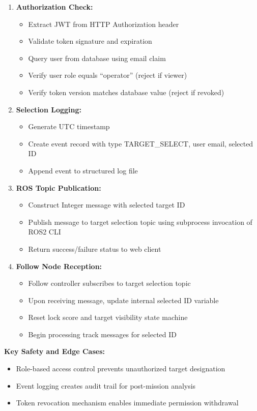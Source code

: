\documentclass[12pt,a4paper]{report}
\begin{document}
\begin{enumerate}
    \item \textbf{Authorization Check:}
    \begin{itemize}
        \item Extract JWT from HTTP Authorization header
        \item Validate token signature and expiration
        \item Query user from database using email claim
        \item Verify user role equals ``operator'' (reject if viewer)
        \item Verify token version matches database value (reject if revoked)
    \end{itemize}
    \item \textbf{Selection Logging:}
    \begin{itemize}
        \item Generate UTC timestamp
        \item Create event record with type TARGET\_SELECT, user email, selected ID
        \item Append event to structured log file
    \end{itemize}
    \item \textbf{ROS Topic Publication:}
    \begin{itemize}
        \item Construct Integer message with selected target ID
        \item Publish message to target selection topic using subprocess invocation of \ac{ROS2} \ac{CLI}
        \item Return success/failure status to web client
    \end{itemize}
    \item \textbf{Follow Node Reception:}
    \begin{itemize}
        \item Follow controller subscribes to target selection topic
        \item Upon receiving message, update internal selected ID variable
        \item Reset lock score and target visibility state machine
        \item Begin processing track messages for selected ID
    \end{itemize}
\end{enumerate}
\textbf{Key Safety and Edge Cases:}
\begin{itemize}
    \item Role-based access control prevents unauthorized target designation
    \item Event logging creates audit trail for post-mission analysis
    \item Token revocation mechanism enables immediate permission withdrawal
\end{itemize}
\end{document}
